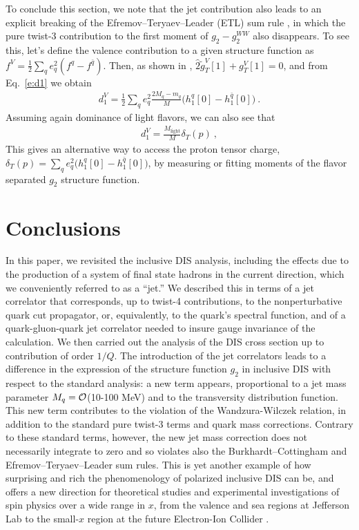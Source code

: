 \documentclass[preprintnumbers,floatfix,nofootinbib]{revtex4}
\newcommand{\mj}{M_q}
\newcommand{\mq}{m_q}
\begin{document}
To conclude this section, we note that the jet contribution also leads to an explicit breaking of the Efremov--Teryaev--Leader (ETL) sum rule \cite{Efremov:1996hd}, in which the pure twist-3 contribution to the first moment of $g_2-g_2^{WW}$ also disappears. To see this, let's define the valence contribution to a given structure function as $f^V=\frac12\sum_q e_q^2 (f^q-f^{\bar q})$. Then, as shown in \cite{Efremov:1996hd}, $\widehat 2\tilde g_T^V[1] + g_T^V[1]  = 0$, and from Eq.~\eqref{e:d1} we obtain
\begin{align}
  d_1^V = \frac12 \sum_q e_q^2 \frac{2\mj- \mq}{M} 
    \big(h_1^{q}[0]-h_1^{\bar q}[0]\big) \ .
\end{align}
Assuming again dominance of light flavors, we can also see that 
\begin{align}
  d_1^V = \frac{M_{\text{light}}}{M} \delta_T(p) \ ,   
\end{align}
This gives an alternative way to access the proton tensor charge, $\delta_T(p) = \sum_q e_q^2 \big(h_1^{q}[0]-h_1^{\bar q}[0]\big)$, by measuring or fitting moments of the flavor separated $g_2$ structure function.




\section{Conclusions}

In this paper, we revisited the inclusive DIS analysis, including the
effects due to the production of a system of final state hadrons in the current direction, which we
conveniently referred to as a ``jet.'' We described this in terms of a jet
correlator that corresponds, up to twist-4 contributions, to the nonperturbative quark cut propagator, or, equivalently, to the quark's spectral function, and of a quark-gluon-quark jet correlator needed to insure gauge invariance of the calculation.
We then carried out the analysis of
the DIS cross section up to contribution of order $1/Q$. 
The introduction of the jet correlators 
leads to a difference in the expression of the structure function $g_2$ in
inclusive DIS with respect to the standard analysis: a new term appears, proportional to a jet mass parameter $\mj={\cal O}$(10-100 MeV)
and to the transversity distribution function. This new term
contributes to the violation of the Wandzura-Wilczek relation, in addition to
the standard pure twist-3 terms and quark mass corrections. Contrary to these
standard terms, however, the new jet mass correction does not necessarily integrate to zero and so violates also the
Burkhardt--Cottingham and Efremov--Teryaev--Leader sum rules. This is yet another example of how surprising
and rich the phenomenology of polarized inclusive DIS can be,
and offers a new direction for theoretical studies and experimental investigations of spin physics over a wide range in $x$, from the valence and sea regions at Jefferson Lab \cite{Dudek:2012vr} to the small-$x$ region at the future Electron-Ion Collider \cite{Accardi:2012qut}.
\end{document}
